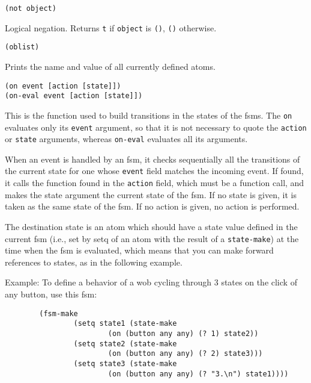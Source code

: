         
{\usagefont\begin{verbatim}
(not object)
\end{verbatim}}\usageupspace

Logical negation. Returns \verb"t" if \verb"object" is \verb"()",
\verb"()" otherwise.

        
{\usagefont\begin{verbatim}
(oblist)
\end{verbatim}}\usageupspace

Prints the name and value of all currently defined {\WOOL} atoms.

        
{\usagefont\begin{verbatim}
(on event [action [state]])
(on-eval event [action [state]])
\end{verbatim}}\usageupspace

This is the function used to build transitions in the states of the fsms.
The \verb"on" evaluates only its \verb"event" argument, so that it is not
necessary to quote the \verb"action" or \verb"state" arguments, whereas
\verb"on-eval" evaluates all its arguments.

When an event is handled by an fsm, it checks sequentially all the
transitions of the current state for one whose \verb"event" field matches
the incoming event. If found, it calls the {\WOOL} function found in the
\verb"action" field, which must be a function call, and makes the
state argument the current state of the fsm. If no  state is given, it is
taken as the same state of the fsm. If no action is given, no action is
performed.

The destination state is an atom which should have a state value defined in
the current fsm (i.e., set by setq of an atom 
with the result of a \verb"state-make") at
the time when the fsm is evaluated, which means that you can make forward
references to states, as in the following example.

Example: To define a behavior of a wob cycling through 3 states on the
click of any button, use this fsm:

{\exemplefont\begin{verbatim}
        (fsm-make 
                (setq state1 (state-make
                        (on (button any any) (? 1) state2))
                (setq state2 (state-make
                        (on (button any any) (? 2) state3)))
                (setq state3 (state-make
                        (on (button any any) (? "3.\n") state1))))
\end{verbatim}}

